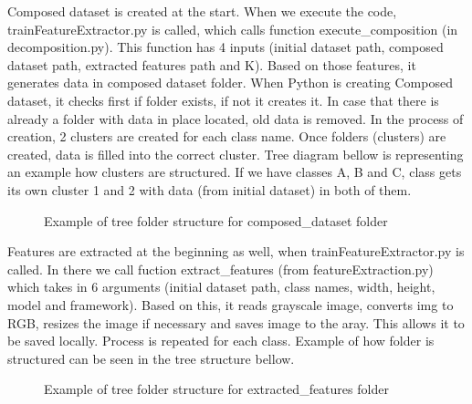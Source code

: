 Composed dataset is created at the start. When we execute the code, trainFeatureExtractor.py is called, which calls function execute{\_}composition (in decomposition.py). This function has 4 inputs (initial dataset path, composed dataset path, extracted features path and K). Based on those features, it generates data in composed dataset folder. 
\newline
When Python is creating Composed dataset, it checks first if folder exists, if not it creates it. In case that there is already a folder with data in place located, old data is removed. In the process of creation, 2 clusters are created for each class name. Once folders (clusters) are created, data is filled into the correct cluster. Tree diagram bellow is representing an example how clusters are structured. If we have classes A, B and C, class gets its own cluster 1 and 2 with data (from initial dataset) in both of them.
\newpage
\begin{figure}[!ht]
    \caption{Example of tree folder structure for composed{\_}dataset folder}
\end{figure}

Features are extracted at the beginning as well, when trainFeatureExtractor.py is called. In there we call fuction extract{\_}features (from featureExtraction.py) which takes in 6 arguments (initial dataset path, class names, width, height, model and framework). Based on this, it reads grayscale image, converts img to RGB, resizes the image if necessary and saves image to the aray. This allows it to be saved locally. Process is repeated for each class. Example of how folder is structured can be seen in the tree structure bellow.
\begin{figure}[!ht]
    \caption{Example of tree folder structure for extracted{\_}features folder}
\end{figure}
\newpage

